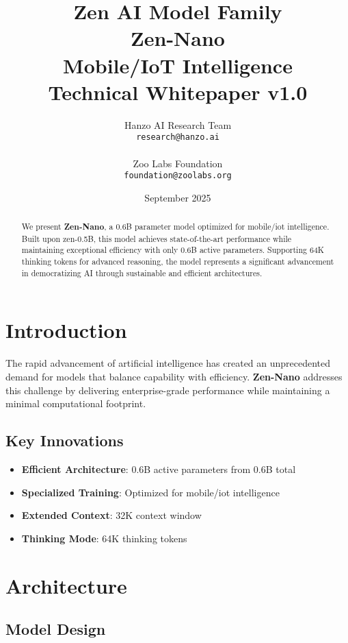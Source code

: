 \documentclass[11pt,a4paper]{article}
\title{
    \vspace{-2cm}
    \Large \textbf{Zen AI Model Family} \\
    \vspace{0.5cm}
    \Huge \textbf{Zen-Nano} \\
    \vspace{0.3cm}
    \large Mobile/IoT Intelligence \\
    \vspace{0.5cm}
    \normalsize Technical Whitepaper v1.0
}
\author{
    Hanzo AI Research Team \\
    \texttt{research@hanzo.ai} \\
    \\
    Zoo Labs Foundation \\
    \texttt{foundation@zoolabs.org}
}
\date{September 2025}
\begin{document}
\maketitle

\begin{abstract}
We present \textbf{Zen-Nano}, a 0.6B parameter model optimized for mobile/iot intelligence. 
Built upon zen-0.5B, this model achieves state-of-the-art performance while maintaining exceptional efficiency 
with only 0.6B active parameters. Supporting 64K thinking tokens for advanced reasoning, the model represents a significant advancement in democratizing AI through sustainable and efficient architectures.
\end{abstract}

\tableofcontents
\newpage

\section{Introduction}

The rapid advancement of artificial intelligence has created an unprecedented demand for models that balance capability with efficiency. 
\textbf{Zen-Nano} addresses this challenge by delivering enterprise-grade performance while maintaining a minimal computational footprint.

\subsection{Key Innovations}
\begin{itemize}
    \item \textbf{Efficient Architecture}: 0.6B active parameters from 0.6B total
    \item \textbf{Specialized Training}: Optimized for mobile/iot intelligence
    \item \textbf{Extended Context}: 32K context window
    \item \textbf{Thinking Mode}: 64K thinking tokens
    
    
\end{itemize}

\section{Architecture}

\subsection{Model Design}
\end{document}
